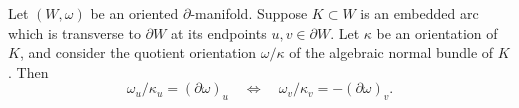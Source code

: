 Let $(W, \omega)$ be an oriented $\partial$-manifold. Suppose $K \subset W$ is an embedded arc which is transverse to $\partial W$ at its endpoints $u, v \in \partial W$. Let $\kappa$ be an orientation of $K$, and consider the quotient orientation $\omega/\kappa$ of the algebraic normal bundle of $K$. Then
$$
\omega_u/\kappa_u = (\partial \omega)_u \quad\Longleftrightarrow\quad \omega_v/\kappa_v = -(\partial \omega)_v.
$$

